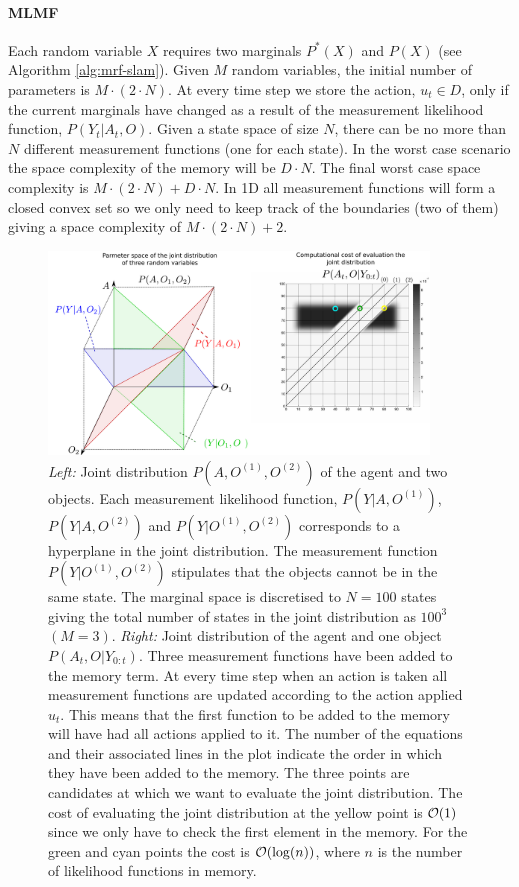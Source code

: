 \paragraph{MLMF}

Each random variable $X$ requires two marginals $P^{*}(X)$ and $P(X)$ (see Algorithm \ref{alg:mrf-slam}). Given
$M$ random variables, the initial number of parameters is $M \cdot (2 \cdot N)$. At every time step we store 
the action, $u_t \in D$, only if the current marginals have changed as a result of the measurement likelihood function, $P(Y_t|A_t,O)$.
Given a state space of size $N$, there can be no more than $N$ different measurement functions (one for each state). In
the worst case scenario the space complexity of the memory will be $D\cdot N$. The final worst case space complexity is
$M \cdot (2 \cdot N) + D \cdot N$. In 1D all measurement functions will form a closed convex set so we only need to 
keep track of the boundaries (two of them) giving a space complexity of  $M \cdot (2 \cdot N) + 2$.

\begin{figure}
 \centering
  \includegraphics[width=0.9\textwidth]{./ch5-MLMF/Figures/Figure8.pdf}
  \caption{\textit{Left:} Joint distribution $P(A,O^{(1)},O^{(2)})$ of the agent and two objects. Each measurement likelihood function, $P(Y|A,O^{(1)})$, 
  $P(Y|A,O^{(2)})$ and $P(Y|O^{(1)},O^{(2)})$ corresponds to a hyperplane in the joint distribution. The measurement function $P(Y|O^{(1)},O^{(2)})$ 
  stipulates that the objects cannot be in the same state. The marginal space is discretised to $N = 100$ states giving the total number of states in 
  the joint distribution as $100^3$ $(M=3)$. \textit{Right:} Joint distribution of the agent and one object $P(A_t,O|Y_{0:t})$. Three measurement 
  functions have been added to the memory term. At every time step when an action is taken all measurement functions are updated according to 
  the action applied $u_t$. This means that the first function to be added to the memory will have had all actions applied to it. The number 
  of the equations and their associated lines in the plot indicate the order in which they have been added to the memory. 
  The three points are candidates at which we want to evaluate the joint distribution.  The cost of evaluating the 
  joint distribution at the yellow point is $\operatorname{\mathcal{O}}(1)$ since we only have to check the first element in the memory. 
  For the green and cyan points the cost is $\operatorname{\mathcal{O}}(\log(n))$, where $n$ is the number of likelihood functions in memory.}
  \label{fig:3bel_lik_profile}
\end{figure}

